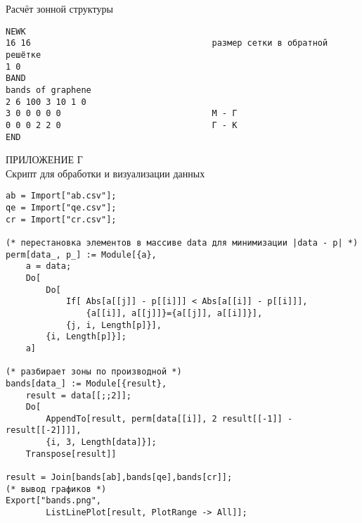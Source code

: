 \vspace{1cm}
Расчёт зонной структуры
\begin{Verbatim}[fontsize=\footnotesize]
NEWK
16 16                                    размер сетки в обратной решётке
1 0
BAND
bands of graphene
2 6 100 3 10 1 0
3 0 0 0 0 0                              M - Г
0 0 0 2 2 0                              Г - K
END
\end{Verbatim}
\newpage
\begin{center}
    ПРИЛОЖЕНИЕ Г\\
    Скрипт для обработки и визуализации данных
\end{center}
\begin{Verbatim}[fontsize=\footnotesize]
ab = Import["ab.csv"];
qe = Import["qe.csv"];
cr = Import["cr.csv"];

(* перестановка элементов в массиве data для минимизации |data - p| *)
perm[data_, p_] := Module[{a},
    a = data;
    Do[
        Do[
            If[ Abs[a[[j]] - p[[i]]] < Abs[a[[i]] - p[[i]]],
                {a[[i]], a[[j]]}={a[[j]], a[[i]]}],
            {j, i, Length[p]}],
        {i, Length[p]}];
    a]

(* разбирает зоны по производной *)
bands[data_] := Module[{result},
    result = data[[;;2]];
    Do[
        AppendTo[result, perm[data[[i]], 2 result[[-1]] - result[[-2]]]],
        {i, 3, Length[data]}];
    Transpose[result]]

result = Join[bands[ab],bands[qe],bands[cr]];
(* вывод графиков *)
Export["bands.png",
        ListLinePlot[result, PlotRange -> All]];
\end{Verbatim}